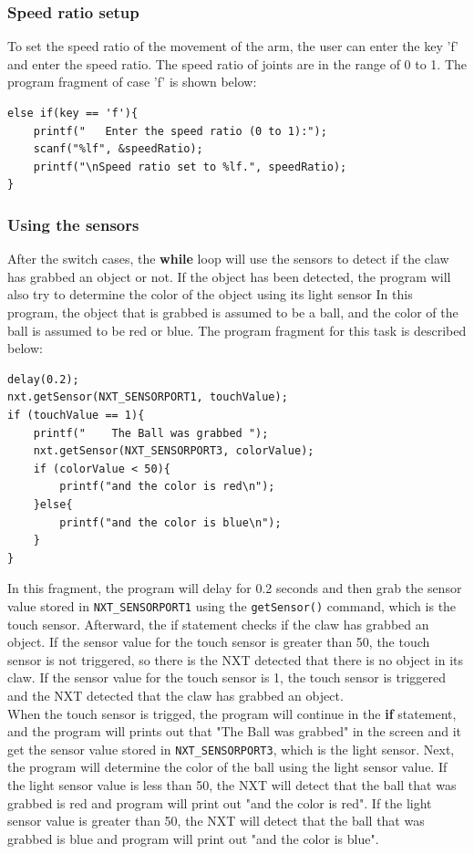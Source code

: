 \documentclass[11pt]{article}
\begin{document}
\subsubsection*{Speed ratio setup}
To set the speed ratio of the movement of the arm, the user can enter the key 
'f' and enter the speed ratio. The speed ratio of joints are in the range of 0 
to 1. The program fragment of case 'f' is shown below:
\begin{lstlisting}
else if(key == 'f'){
    printf("   Enter the speed ratio (0 to 1):");
    scanf("%lf", &speedRatio);
    printf("\nSpeed ratio set to %lf.", speedRatio);
}
\end{lstlisting}

\subsubsection*{Using the sensors}
After the switch cases, the {\bf while} loop will use the sensors to detect if 
the claw has grabbed an object or not. If the object has been detected, the 
program will also try to determine the color of the object using its light sensor 
In this program, the object that is grabbed is assumed to be a ball, and the 
color of the ball is assumed to be red or blue. The program fragment for this 
task is described below:
\begin{lstlisting}
delay(0.2);
nxt.getSensor(NXT_SENSORPORT1, touchValue);
if (touchValue == 1){
    printf("    The Ball was grabbed ");
    nxt.getSensor(NXT_SENSORPORT3, colorValue);
    if (colorValue < 50){
        printf("and the color is red\n");
    }else{
        printf("and the color is blue\n");
    }
}
\end{lstlisting}
In this fragment, the program will delay for 0.2 seconds and then grab the sensor 
value stored in {\tt NXT\_SENSORPORT1} using the {\tt getSensor()} command, which 
is the touch sensor. Afterward, the if statement checks if the claw has grabbed an 
object. If the sensor value for the touch sensor is greater than 50, the touch 
sensor is not triggered, so there is the NXT detected that there is no object in 
its claw. If the sensor value for the touch sensor is 1, the touch sensor is 
triggered and the NXT detected that the claw has grabbed an object. \\

When the touch sensor is trigged, the program will continue in the {\bf if} statement, 
and the program will prints out that "The Ball was grabbed" in the screen and it get 
the sensor value stored in {\tt NXT\_SENSORPORT3}, which is the light sensor. Next, the 
program will determine the color of the ball using the light sensor value. If the light 
sensor value is less than 50, the NXT will detect that the ball that was grabbed is 
red and program will print out "and the color is red". If the light sensor value is 
greater than 50, the NXT will detect that the ball that was grabbed is blue and program 
will print out "and the color is blue". \\
\end{document}
